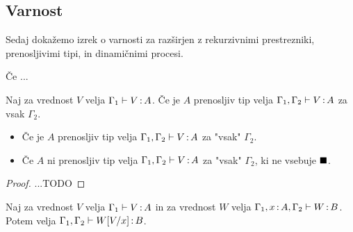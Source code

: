 \subsection{Varnost}

Sedaj dokažemo izrek o varnosti za \lae{} razširjen z rekurzivnimi prestrezniki, prenosljivimi tipi, in dinamičnimi procesi.


\begin{izrek}[o napredku]
	Če ...
\end{izrek}


\begin{lema}\label{lem:razsiritev-konteksta-2}
	Naj za vrednost $V$ velja $\Gamma_1 \vdash V \mathinner{:} A$. Če je $A$ prenosljiv tip velja $\Gamma_1, \Gamma_2 \vdash V \mathinner{:} A$ za vsak $\Gamma_2$.
	\begin{itemize}
		\item Če je $A$ prenosljiv tip velja $\Gamma_1, \Gamma_2 \vdash V \mathinner{:} A$ za "vsak" $\Gamma_2$.
		\item Če $A$ ni prenosljiv tip velja $\Gamma_1, \Gamma_2 \vdash V \mathinner{:} A$ za "vsak" $\Gamma_2$, ki ne vsebuje $\blacksquare$.
	\end{itemize}
\end{lema}

\begin{proof}
	...TODO
\end{proof}

\begin{lema}\label{lem:substitucija-vrednosti-2}
	Naj za vrednost $V$ velja $\Gamma_1 \vdash V \mathinner{:} A$ in za vrednost $W$ velja $\Gamma_1, x \mathinner{:} A, \Gamma_2 \vdash W \mathinner{:} B$. Potem velja $\Gamma_1, \Gamma_2 \vdash W[V/x] \mathinner{:} B$.
\end{lema}

